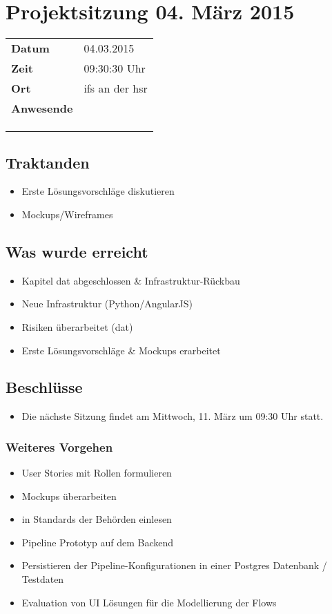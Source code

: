 \documentclass[class=scrbook,crop=false]{standalone}
\begin{document}
	
	\section{Projektsitzung 04. März 2015}
	
	\begin{tabular}{ll}
		\textbf{Datum} & 04.03.2015 \\
		\textbf{Zeit} & 09:30\textendash10:30 Uhr \\
		\textbf{Ort} & \acs{ifs} an der \acs{hsr} \\
		\textbf{Anwesende} & \proff \\ & \chuf \\ & \rlif \\ & \fscf
	\end{tabular}
	
	\subsection*{Traktanden}
	\begin{itemize}
		\item Erste Lösungsvorschläge diskutieren
		\item Mockups/Wireframes
	\end{itemize}
	
	\subsection*{Was wurde erreicht}
	\begin{itemize}
		\item Kapitel dat abgeschlossen \& Infrastruktur-Rückbau
		\item Neue Infrastruktur (Python/AngularJS)
		\item Risiken überarbeitet (dat)
		\item Erste Lösungsvorschläge \& Mockups erarbeitet
	\end{itemize}
	
	\subsection*{Beschlüsse}
	\begin{itemize}
		\item Die nächste Sitzung findet am Mittwoch, 11. März um 09:30 Uhr statt.
	\end{itemize}
	
	\subsubsection*{Weiteres Vorgehen}
	\begin{itemize}
		\item User Stories mit Rollen formulieren
		\item Mockups überarbeiten
		\item in Standards der Behörden einlesen
		\item Pipeline Prototyp auf dem Backend
		\item Persistieren der Pipeline-Konfigurationen in einer Postgres Datenbank / Testdaten
		\item Evaluation von UI Lösungen für die Modellierung der Flows
	\end{itemize}
	
\end{document}
